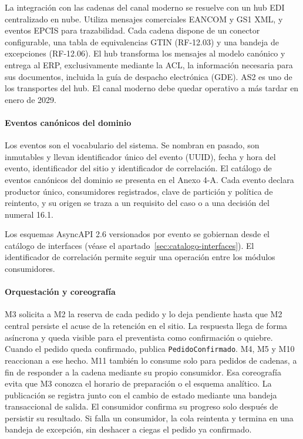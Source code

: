 La integración con las cadenas del canal moderno se resuelve con un hub EDI centralizado en nube. Utiliza mensajes comerciales EANCOM y GS1 XML, y eventos EPCIS para trazabilidad. Cada cadena dispone de un conector configurable, una tabla de equivalencias GTIN (RF-12.03) y una bandeja de excepciones (RF-12.06). El hub transforma los mensajes al modelo canónico y entrega al ERP, exclusivamente mediante la ACL, la información necesaria para sus documentos, incluida la guía de despacho electrónica (GDE). AS2 es uno de los transportes del hub. El canal moderno debe quedar operativo a más tardar en enero de 2029.

\paragraph{Eventos canónicos del dominio}
\label{subsubsec:eventos-canonicos}

Los eventos son el vocabulario del sistema. Se nombran en pasado, son inmutables y llevan identificador único del evento (UUID), fecha y hora del evento, identificador del sitio y identificador de correlación. El catálogo de eventos canónicos del dominio se presenta en el Anexo 4-A. Cada evento declara productor único, consumidores registrados, clave de partición y política de reintento, y su origen se traza a un requisito del caso o a una decisión del numeral 16.1.



Los esquemas AsyncAPI 2.6 versionados por evento se gobiernan desde el catálogo de interfaces (véase el apartado~\ref{sec:catalogo-interfaces}). El identificador de correlación permite seguir una operación entre los módulos consumidores.

\paragraph{Orquestación y coreografía}
M3 solicita a M2 la reserva de cada pedido y lo deja pendiente hasta que M2 central persiste el acuse de la retención en el sitio. La respuesta llega de forma asíncrona y queda visible para el preventista como confirmación o quiebre. Cuando el pedido queda confirmado, publica \texttt{PedidoConfirmado}. M4, M5 y M10 reaccionan a ese hecho. M11 también lo consume solo para pedidos de cadenas, a fin de responder a la cadena mediante su propio consumidor. Esa coreografía evita que M3 conozca el horario de preparación o el esquema analítico. La publicación se registra junto con el cambio de estado mediante una bandeja transaccional de salida. El consumidor confirma su progreso solo después de persistir su resultado. Si falla un consumidor, la cola reintenta y termina en una bandeja de excepción, sin deshacer a ciegas el pedido ya confirmado.

